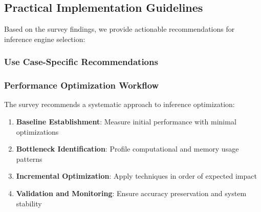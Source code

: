 \documentclass[12pt,a4paper]{article}
\begin{document}
\subsection{Practical Implementation Guidelines}

Based on the survey findings, we provide actionable recommendations for inference engine selection:

\subsubsection{Use Case-Specific Recommendations}

\begin{table}[htbp]
\centering
\caption{Inference Engine Selection Guide by Use Case}
\label{tab:commercial_engines}
\end{table}

\newpage
\subsubsection{Performance Optimization Workflow}

The survey recommends a systematic approach to inference optimization:

\begin{enumerate}
    \item \textbf{Baseline Establishment}: Measure initial performance with minimal optimizations
    \item \textbf{Bottleneck Identification}: Profile computational and memory usage patterns
    \item \textbf{Incremental Optimization}: Apply techniques in order of expected impact
    \item \textbf{Validation and Monitoring}: Ensure accuracy preservation and system stability
\end{enumerate}
\end{document}
